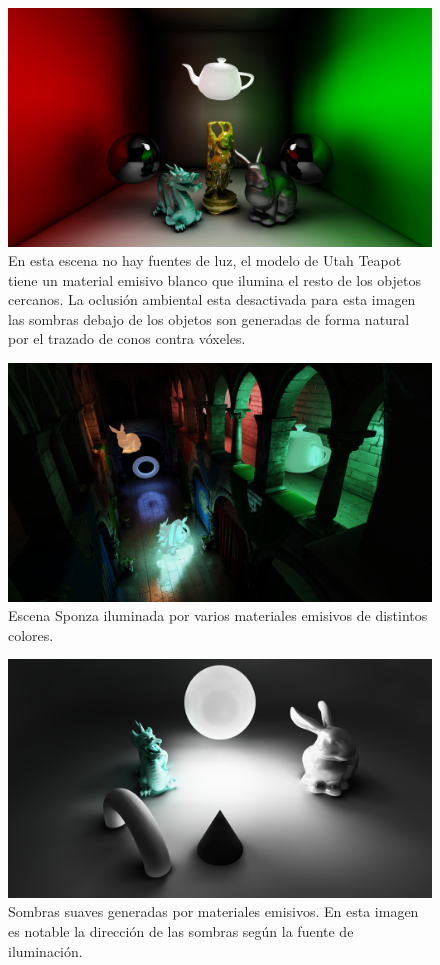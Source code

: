 \begin{figure}[H]
	\centering
	\includegraphics[width=\linewidth]{media/finals/area_teapot.png}
	\caption{En esta escena no hay fuentes de luz, el modelo de Utah Teapot tiene un material emisivo blanco que ilumina el resto de los objetos cercanos. La oclusión ambiental esta desactivada para esta imagen las sombras debajo de los objetos son generadas de forma natural por el trazado de conos contra vóxeles.}
	\label{fig:areapot}
\end{figure}

\begin{figure}[H]
	\centering
	\includegraphics[width=\linewidth]{media/finals/area_sponza.png}
	\caption{Escena Sponza iluminada por varios materiales emisivos de distintos colores.}
	\label{fig:areasponza}
\end{figure}

\begin{figure}[H]
	\centering
	\includegraphics[width=\linewidth]{media/finals/area_shadows.png}
	\caption{Sombras suaves generadas por materiales emisivos. En esta imagen es notable la dirección de las sombras según la fuente de iluminación.}
	\label{fig:areashadows}
\end{figure}
